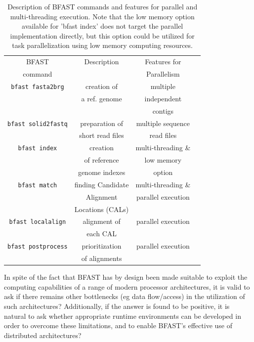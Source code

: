\documentclass{sig-alternate}
\begin{document}
\begin{table}
\small
\begin{tabular}{|c|c|c|c|} 
  \hline BFAST & Description & Features for \\ command & & Parallelism
  \\ \hline \hline \texttt{bfast fasta2brg} & creation of & multiple \\ &a ref. genome &
  independent \\ & & contigs \\ \hline
  \texttt{bfast solid2fastq} & preparation of & multiple sequence \\ & short
  read files & read files\\ \hline

\texttt{bfast index} & creation  & multi-threading \& \\
& of reference  & low memory  \\ 
&genome indexes&option \\
 
  \hline
\texttt{bfast match} & finding Candidate   &  multi-threading \& \\

& Alignment &  parallel execution \\
& Locations (CALs) & \\\hline
\texttt{bfast localalign} & alignment of&   parallel execution \\
&  each CAL   & \\

  \hline
\texttt{bfast postprocess} & prioritization   &  parallel execution \\ 
& of alignments & \\
\hline


\hline
\end{tabular} \caption{Description of BFAST commands and features for parallel and multi-threading execution. 
Note that the low memory option available for 'bfast index' does not target the parallel implementation directly, 
but this option could be utilized for task parallelization using low memory computing resources.}
 \label{table:bfast-summary} 
\end{table}

In spite of the fact that BFAST has by design been made suitable to
exploit the computing capabilities of a range of modern processor
architectures, it is valid to ask if there remains other bottlenecks
(eg data flow/access) in the utilization of such architectures?
Additionally, if the answer is found to be positive, it is natural to
ask whether appropriate runtime environments can be developed in order
to overcome these limitations, and to enable BFAST's effective use of
distributed architectures?
\end{document}
